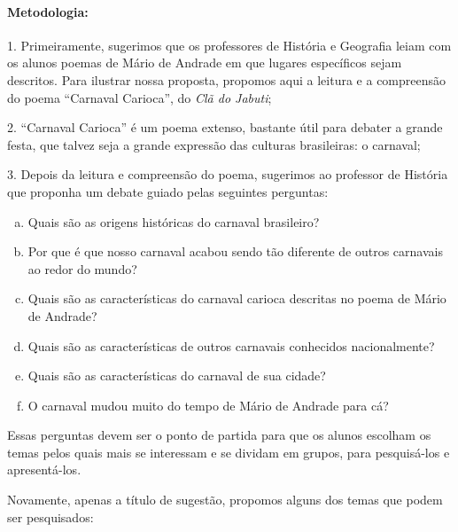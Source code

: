 \documentclass[11pt]{extarticle}
\begin{document}
\paragraph{Metodologia:}


1. Primeiramente, sugerimos que os professores de História e Geografia
leiam com os alunos poemas de Mário de Andrade em que lugares
específicos sejam descritos. Para ilustrar nossa proposta, propomos aqui
a leitura e a compreensão do poema ``Carnaval Carioca'', do \emph{Clã do
Jabuti};

2. ``Carnaval Carioca'' é um poema extenso, bastante útil para debater a
grande festa, que talvez seja a grande expressão das culturas
brasileiras: o carnaval;

3. Depois da leitura e compreensão do poema, sugerimos ao professor de
História que proponha um debate guiado pelas seguintes perguntas:

\begin{enumerate}[(a)]  

\item Quais são as origens históricas do carnaval brasileiro?

\item Por que é que nosso carnaval acabou sendo tão diferente de outros
carnavais ao redor do mundo?

\item Quais são as características do carnaval carioca descritas no poema
de Mário de Andrade?

\item Quais são as características de outros carnavais conhecidos
nacionalmente?

\item Quais são as características do carnaval de sua cidade?

\item O carnaval mudou muito do tempo de Mário de Andrade para cá?

\end{enumerate} 


Essas perguntas devem ser o ponto de partida para que os alunos escolham
os temas pelos quais mais se interessam e se dividam em grupos, para
pesquisá-los e apresentá-los.

Novamente, apenas a título de sugestão, propomos alguns dos temas que
podem ser pesquisados:
\end{document}
